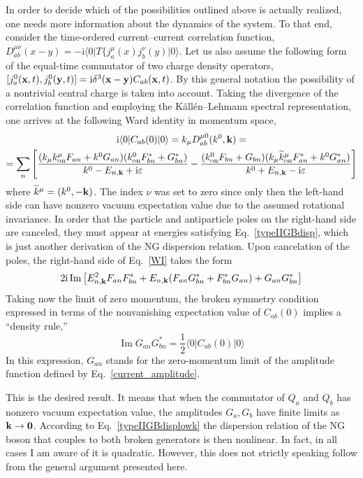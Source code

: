 \documentclass[final,3p,times,12pt,a4paper,sort&compress]{elsarticle}
\newcommand\vek[1]{{\boldsymbol{\bf #1}}}   %
\newcommand\bra[1]{\langle#1\vert}          %
\newcommand\ket[1]{\vert#1\rangle}          %
\newcommand\imag{\mathrm i}                 %
\newcommand\ve{\varepsilon}
\DeclareMathOperator{\im}{Im}               %
\begin{document}
In order to decide which of the possibilities outlined above is actually
realized, one needs more information about the dynamics of the system. To that
end, consider the time-ordered current--current correlation function,
$D^{\mu\nu}_{ab}(x-y)=-\imag\bra0T\{j^\mu_a(x)j^\nu_b(y)\ket0$. Let us also
assume the following form of the equal-time commutator of two charge density
operators, $[j_a^0(\vek x,t),j_b^0(\vek y,t)]=\imag\delta^3(\vek x-\vek
y)C_{ab}(\vek x,t)$. By this general notation the possibility of a nontrivial
central charge is taken into account. Taking the divergence of the correlation
function and employing the K\"all\'en--Lehmann spectral representation, one
arrives at the following Ward identity in momentum space,
\begin{multline}
\imag\bra0C_{ab}(0)\ket0=k_{\mu}D^{\mu0}_{ab}(k^0,\vek k)=\\
=\sum_n\left[\frac{(k_{\mu}k_{\text{on}}^{\mu}F_{an}+k^0G_{an})
(k_{\text{on}}^0F^*_{bn}+G^*_{bn})}
{k^0-E_{n,\vek k}+\imag\ve}
-\frac{(k_{\text{on}}^0F_{bn}+G_{bn})
(k_{\mu}\widetilde k_{\text{on}}^{\mu}F^*_{an}+k^0G^*_{an})}
{k^0+E_{n,\vek k}-\imag\ve}\right]
\label{WI}
\end{multline}
where $\widetilde k^\mu=(k^0,-\vek k)$. The index $\nu$ was set to zero since
only then the left-hand side can have nonzero vacuum expectation value due to
the assumed rotational invariance. In order that the particle and antiparticle
poles on the right-hand side are canceled, they must appear at energies
satisfying Eq.~\eqref{typeIIGBdisp}, which is just another derivation of the NG
dispersion relation. Upon cancelation of the poles, the right-hand side of
Eq.~\eqref{WI} takes the form
\begin{equation}
2\imag\im\left[E_{n,\vek k}^2F_{an}F^*_{bn}+E_{n,\vek
k}(F_{an}G^*_{bn}+F^*_{bn}G_{an})+G_{an}G^*_{bn}\right]
\end{equation}
Taking now the limit of zero momentum, the broken symmetry condition expressed
in terms of the nonvanishing expectation value of $C_{ab}(0)$ implies a
``density rule,''
\begin{equation}
\im G_{an}G^*_{bn}=\frac12\bra0C_{ab}(0)\ket0
\label{density_rule}
\end{equation}
In this expression, $G_{an}$ stands for the zero-momentum limit of the
amplitude function defined by Eq.~\eqref{current_amplitude}.

This is the desired result. It means that when the commutator of $Q_a$ and $Q_b$
has nonzero vacuum expectation value, the amplitudes $G_a,G_b$ have finite
limits as $\vek k\to\vek0$. According to Eq.~\eqref{typeIIGBdisplowk} the
dispersion relation of the NG boson that couples to both broken generators is
then nonlinear. In fact, in all cases I am aware of it is quadratic. However,
this does not strictly speaking follow from the general argument presented here.
\end{document}
